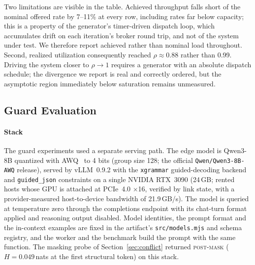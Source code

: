 \documentclass[conference]{IEEEtran}
\begin{document}
Two limitations are visible in the table. Achieved throughput falls short of the nominal offered rate by 7--11\% at every row, including rates far below capacity; this is a property of the generator's timer-driven dispatch loop, which accumulates drift on each iteration's broker round trip, and not of the system under test. We therefore report achieved rather than nominal load throughout. Second, realized utilization consequently reached $\rho\approx0.88$ rather than 0.99. Driving the system closer to $\rho\rightarrow1$ requires a generator with an absolute dispatch schedule; the divergence we report is real and correctly ordered, but the asymptotic region immediately below saturation remains unmeasured.

\subsection{Guard Evaluation}
\label{sec:calib}

\paragraph{Stack} The guard experiments used a separate serving path. The edge model is Qwen3-8B quantized with AWQ~\cite{awq} to 4 bits (group size 128; the official \texttt{Qwen/Qwen3-8B-AWQ} release), served by vLLM~0.9.2 with the \texttt{xgrammar} guided-decoding backend and \texttt{guided\_json} constraints on a single NVIDIA RTX~3090 (24\,GB; rented hosts whose GPU is attached at PCIe~4.0 $\times$16, verified by link state, with a provider-measured host-to-device bandwidth of 21.9\,GB/s). The model is queried at temperature zero through the completions endpoint with its chat-turn format applied and reasoning output disabled. Model identities, the prompt format and the in-context examples are fixed in the artifact's \texttt{src/models.mjs} and schema registry, and the worker and the benchmark build the prompt with the same function. The masking probe of Section~\ref{sec:conflict} returned \textsc{post-mask} ($H=0.049$\,nats at the first structural token) on this stack.
\end{document}
